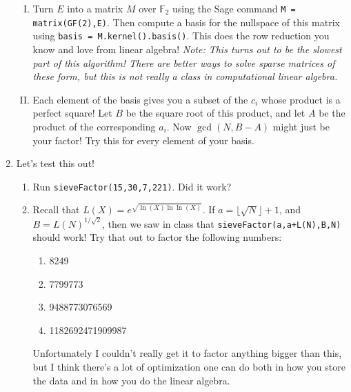\documentclass[11pt]{article}
\newcommand{\bF}{\mathbb{F}}
\begin{document}
\begin{enumerate}
{\begin{enumerate}[(I)]
{    }
    \item{
    Turn $E$ into a matrix $M$ over $\bF_2$ using the Sage command \verb|M = matrix(GF(2),E)|.  Then compute a basis for the nullspace of this matrix using \verb|basis = M.kernel().basis()|.  This does the row reduction you know and love from linear algebra!  \textit{Note: This turns out to be the slowest part of this algorithm!  There are better ways to solve sparse matrices of these form, but this is not really a class in computational linear algebra.}
    }
    \item{
    Each element of the basis gives you a subset of the $c_i$ whose product is a perfect square!  Let $B$ be the square root of this product, and let $A$ be the product of the corresponding $a_i$.  Now $\gcd(N,B-A)$ might just be your factor!  Try this for every element of your basis.
    }
  \end{enumerate}
  }
  \item{
  Let's test this out!
  \begin{enumerate}
    \item{
    Run \verb|sieveFactor(15,30,7,221)|.  Did it work?
    }
    \item{
    Recall that $L(X) = e^{\sqrt{\ln(X)\ln\ln(X)}}$.  If $a = \lfloor\sqrt N\rfloor + 1$, and $B = L(N)^{1/\sqrt{2}}$, then we saw in class that \verb|sieveFactor(a,a+L(N),B,N)| should work!  Try that out to factor the following numbers:
    \begin{enumerate}
      \item{8249}
      \item{7799773}
      \item{9488773076569}
      \item{1182692471909987}
    \end{enumerate}
    Unfortunately I couldn't really get it to factor anything bigger than this, but I think there's a lot of optimization one can do both in how you store the data and in how you do the linear algebra.
    }
  \end{enumerate}
  }
\end{enumerate}
\end{document}

